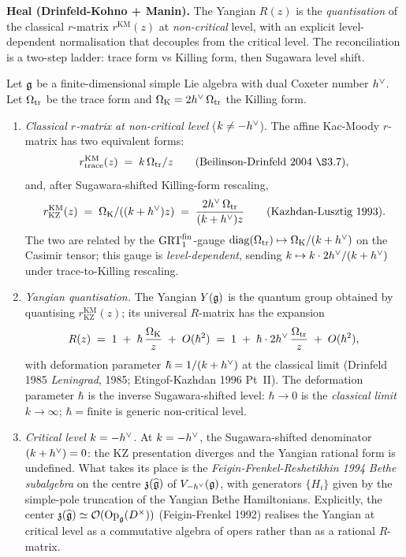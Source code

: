 \textbf{Heal (Drinfeld-Kohno + Manin).}
The Yangian $R(z)$ is the \emph{quantisation} of the classical
$r$-matrix $r^{\mathrm{KM}}(z)$ at \emph{non-critical} level, with an
explicit level-dependent normalisation that decouples from the critical
level. The reconciliation is a two-step ladder: trace form vs Killing
form, then Sugawara level shift.

\begin{theorem}\ClaimStatusTheorem
\label{thm:yangian-km-nc}
Let $\mathfrak{g}$ be a finite-dimensional simple Lie algebra with dual Coxeter
number $h^{\vee}$. Let $\Omega_{\mathrm{tr}}$ be the trace form and
$\Omega_{\mathrm{K}} = 2h^{\vee}\,\Omega_{\mathrm{tr}}$ the Killing form.

\begin{enumerate}
\item \emph{Classical $r$-matrix at non-critical level}
   ($k \ne -h^{\vee}$). The affine Kac-Moody $r$-matrix has two equivalent
   forms:
   \[
      r^{\mathrm{KM}}_{\mathrm{trace}}(z)
      \;=\; k\,\Omtr/z
      \qquad\text{(Beilinson-Drinfeld 2004 \S3.7)},
   \]
   and, after Sugawara-shifted Killing-form rescaling,
   \[
      r^{\mathrm{KM}}_{\mathrm{KZ}}(z)
      \;=\; \Omega_{\mathrm{K}}/((k + h^{\vee})z)
      \;=\; \frac{2h^{\vee}\,\Omega_{\mathrm{tr}}}{(k + h^{\vee})z}
      \qquad\text{(Kazhdan-Lusztig 1993)}.
   \]
   The two are related by the $\mathrm{GRT}_1^{\mathrm{fin}}$-gauge
   $\mathrm{diag}(\Omega_{\mathrm{tr}}) \mapsto \Omega_{\mathrm{K}}/(k + h^{\vee})$ on the Casimir tensor;
   this gauge is \emph{level-dependent}, sending
   $k \mapsto k \cdot 2h^{\vee}/(k + h^{\vee})$ under trace-to-Killing
   rescaling.

\item \emph{Yangian quantisation.} The Yangian $Y(\mathfrak{g})$ is the quantum
   group obtained by quantising $r^{\mathrm{KM}}_{\mathrm{KZ}}(z)$; its
   universal $R$-matrix has the expansion
   \[
      R(z) \;=\; 1 \;+\; \hbar\,\frac{\Omega_{\mathrm{K}}}{z} \;+\; O(\hbar^2)
              \;=\; 1 \;+\; \hbar \cdot 2h^{\vee}\,\frac{\Omega_{\mathrm{tr}}}{z} \;+\; O(\hbar^2),
   \]
   with deformation parameter $\hbar = 1/(k + h^{\vee})$ at the classical
   limit (Drinfeld 1985 \emph{Leningrad}, 1985; Etingof-Kazhdan 1996
   Pt~II). The deformation parameter $\hbar$ is the inverse
   Sugawara-shifted level: $\hbar \to 0$ is the \emph{classical limit}
   $k \to \infty$; $\hbar = \text{finite}$ is generic non-critical
   level.

\item \emph{Critical level $k = -h^{\vee}$.} At $k = -h^{\vee}$, the
   Sugawara-shifted denominator $(k + h^{\vee}) = 0$: the KZ presentation
   diverges and the Yangian rational form is undefined. What takes its
   place is the \emph{Feigin-Frenkel-Reshetikhin 1994}
   \emph{Bethe subalgebra} on the centre $\mathfrak{z}(\widehat{\mathfrak{g}})$
   of $V_{-h^{\vee}}(\mathfrak{g})$, with generators $\{H_i\}$ given by the simple-pole
   truncation of the Yangian Bethe Hamiltonians. Explicitly, the
   center $\mathfrak{z}(\widehat{\mathfrak{g}}) \simeq \mathcal{O}(\mathrm{Op}_{\mathfrak{g}}(D^\times))$
   (Feigin-Frenkel 1992) realises the Yangian at critical level as a
   commutative algebra of opers rather than as a rational $R$-matrix.


\end{enumerate}
\end{theorem}
